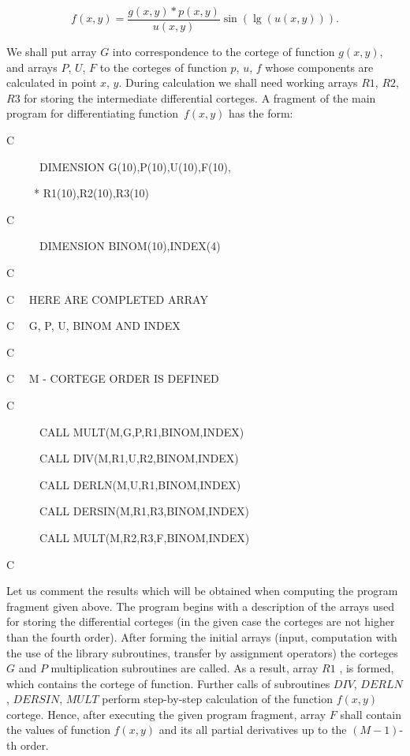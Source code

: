 $$
f(x,y)=\frac{g(x,y)*p(x,y)}{u(x,y)}\sin \left( \lg \left( u(x,y)\right)
\right) . 
$$

We shall put array $G$ into correspondence to the cortege of function $%
g(x,y) $, and arrays $P$, $U$, $F$ to the corteges of function $p$, $u$, $f$
whose components are calculated in point $x$, $y$. During calculation we
shall need working arrays $R1$, $R2$, $R3$ for storing the intermediate
differential corteges. A fragment of the main program for differentiating
function\ $f(x,y)$ has the form:

C

\ \ \ \ \ \ DIMENSION G(10),P(10),U(10),F(10),

\ \ \ \ \ * R1(10),R2(10),R3(10)

C

\ \ \ \ \ \ DIMENSION BINOM(10),INDEX(4)

C

C \ \ HERE ARE COMPLETED ARRAY

C \ \ G, P, U, BINOM AND INDEX

C

C \ \ M - CORTEGE ORDER IS DEFINED

C

\ \ \ \ \ \ CALL MULT(M,G,P,R1,BINOM,INDEX)

\ \ \ \ \ \ CALL DIV(M,R1,U,R2,BINOM,INDEX)

\ \ \ \ \ \ CALL DERLN(M,U,R1,BINOM,INDEX)

\ \ \ \ \ \ CALL DERSIN(M,R1,R3,BINOM,INDEX)

\ \ \ \ \ \ CALL MULT(M,R2,R3,F,BINOM,INDEX)

C

Let us comment the results which will be obtained when computing the program
fragment given above. The program begins with a description of the arrays
used for storing the differential corteges (in the given case the corteges
are not higher than the fourth order). After forming the initial arrays
(input, computation with the use of the library subroutines, transfer by
assignment operators) the corteges $G$ and $P$ multiplication subroutines
are called. As a result, array $R1$ , is formed, which contains the cortege
of function. Further calls of subroutines $DIV$, $DERLN$, $DERSIN$, $MULT$
perform step-by-step calculation of the function $f(x,y)$ cortege. Hence,
after executing the given program fragment, array $F$ shall contain the
values of function $f(x,y)$ and its all partial derivatives up to the $%
\left( M-1\right) $-th order.

